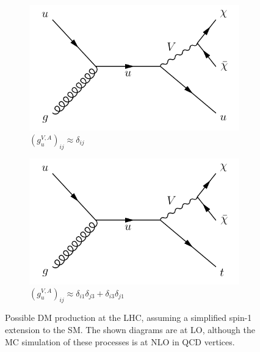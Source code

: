 \begin{figure}[]
    \begin{center}
        \begin{subfigure}[t]{0.49\textwidth}
            \includegraphics[width=\textwidth]{figures/monotop/diagrams/mj.pdf}
            \caption{$(g_{u}^{V,A})_{ij} \approx \delta_{ij}$}
            \label{fig:mt:fcncdiaga}
        \end{subfigure}
        \begin{subfigure}[t]{0.49\textwidth}
            \includegraphics[width=\textwidth]{figures/monotop/diagrams/fcncb.pdf}
            \caption{$(g_{u}^{V,A})_{ij} \approx \delta_{i1}\delta_{j3} + \delta_{i3}\delta_{j1}$}
            \label{fig:mt:fcncdiagb}
        \end{subfigure}
        \caption{Possible DM production at the LHC, assuming a simplified spin-1 extension to the SM.
                 The shown diagrams are at LO, although the MC simulation of these processes is at NLO in QCD vertices.}
        \label{fig:mt:fcncdiag}
    \end{center}
\end{figure}

